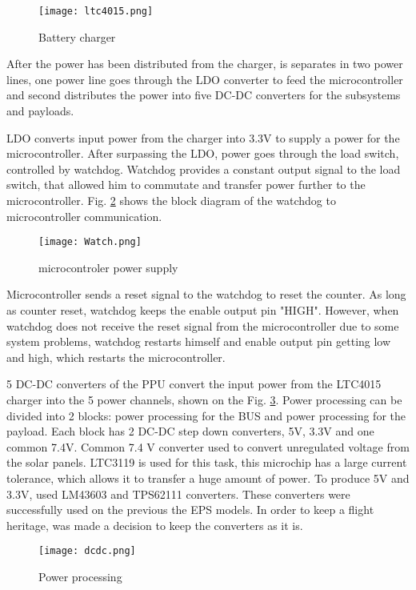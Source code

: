   \begin{figure}[h]
  	\centering
  	\texttt{[image: ltc4015.png]}
  	\caption{Battery charger}
  	\label{fig: ltc40151}
  \end{figure}
  
 After the power has been distributed from the charger, is separates in two power lines, one power line goes through the LDO converter to feed the microcontroller and second distributes the power into five DC-DC converters for the subsystems and payloads.
 
 LDO converts input power from the charger into 3.3V to supply a power for the microcontroller. After surpassing the LDO, power goes through the load switch, controlled by watchdog. Watchdog provides a constant output signal to the load switch, that allowed him to commutate and transfer power further to the microcontroller. Fig. \ref{fig: mic} shows the block diagram of the watchdog to microcontroller communication.
  
    \begin{figure}[h]
    	\centering
    	\texttt{[image: Watch.png]}
    	\caption{microcontroler power supply}
    	\label{fig: mic}
    \end{figure}
  Microcontroller sends a reset signal to the watchdog to reset the counter. As long as counter reset, watchdog keeps the enable output pin "HIGH". However, when watchdog does not receive the reset signal from the microcontroller due to some system problems, watchdog restarts himself and enable output pin getting low and high, which restarts the microcontroller. 
  
  5 DC-DC converters of the PPU convert the input power from the LTC4015 charger into the 5 power channels, shown on the Fig. \ref{fig: dc}. Power processing can be divided into 2 blocks: power processing for the BUS and power processing for the payload. Each block has 2 DC-DC step down converters, 5V, 3.3V and one common 7.4V. Common 7.4 V converter used to convert unregulated voltage from the solar panels. LTC3119 is used for this task, this microchip has a large current tolerance, which allows it to transfer a huge amount of power. To produce 5V and 3.3V, used LM43603 and TPS62111 converters. These converters were successfully used on the previous the EPS models. In order to keep a flight heritage, was made a decision to keep the converters as it is. 
  
   \begin{figure}[h]
   	\centering
   	\texttt{[image: dcdc.png]}
   	\caption{Power processing}
   	\label{fig: dc}
   \end{figure}
  

